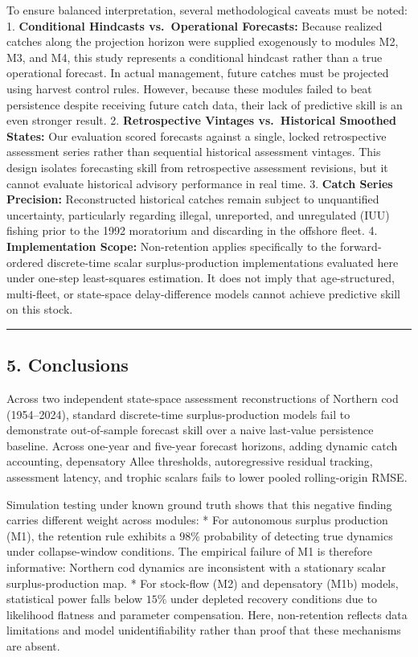 \documentclass[11pt]{article}
\begin{document}
To ensure balanced interpretation, several methodological caveats must
be noted: 1. \textbf{Conditional Hindcasts vs.~Operational Forecasts:}
Because realized catches along the projection horizon were supplied
exogenously to modules M2, M3, and M4, this study represents a
conditional hindcast rather than a true operational forecast. In actual
management, future catches must be projected using harvest control
rules. However, because these modules failed to beat persistence despite
receiving future catch data, their lack of predictive skill is an even
stronger result. 2. \textbf{Retrospective Vintages vs.~Historical
Smoothed States:} Our evaluation scored forecasts against a single,
locked retrospective assessment series rather than sequential historical
assessment vintages. This design isolates forecasting skill from
retrospective assessment revisions, but it cannot evaluate historical
advisory performance in real time. 3. \textbf{Catch Series Precision:}
Reconstructed historical catches remain subject to unquantified
uncertainty, particularly regarding illegal, unreported, and unregulated
(IUU) fishing prior to the 1992 moratorium and discarding in the
offshore fleet. 4. \textbf{Implementation Scope:} Non-retention applies
specifically to the forward-ordered discrete-time scalar
surplus-production implementations evaluated here under one-step
least-squares estimation. It does not imply that age-structured,
multi-fleet, or state-space delay-difference models cannot achieve
predictive skill on this stock.

\begin{center}\rule{0.5\linewidth}{0.5pt}\end{center}

\subsection{5. Conclusions}\label{conclusions}

Across two independent state-space assessment reconstructions of
Northern cod (1954--2024), standard discrete-time surplus-production
models fail to demonstrate out-of-sample forecast skill over a naive
last-value persistence baseline. Across one-year and five-year forecast
horizons, adding dynamic catch accounting, depensatory Allee thresholds,
autoregressive residual tracking, assessment latency, and trophic
scalars fails to lower pooled rolling-origin RMSE.

Simulation testing under known ground truth shows that this negative
finding carries different weight across modules: * For autonomous
surplus production (M1), the retention rule exhibits a \(98\%\)
probability of detecting true dynamics under collapse-window conditions.
The empirical failure of M1 is therefore informative: Northern cod
dynamics are inconsistent with a stationary scalar surplus-production
map. * For stock-flow (M2) and depensatory (M1b) models, statistical
power falls below \(15\%\) under depleted recovery conditions due to
likelihood flatness and parameter compensation. Here, non-retention
reflects data limitations and model unidentifiability rather than proof
that these mechanisms are absent.
\end{document}
